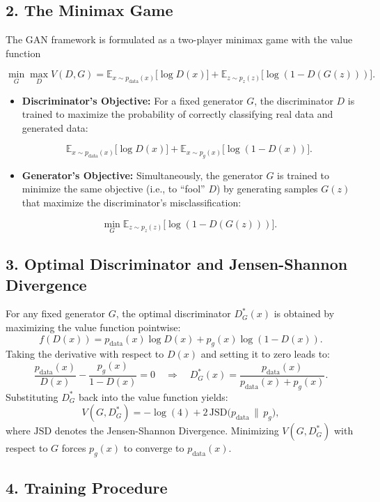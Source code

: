 \documentclass{article}
\begin{document}
\subsection*{2. The Minimax Game}

The GAN framework is formulated as a two-player minimax game with the value function

\[
\min_{G} \max_{D} V(D,G) = \mathbb{E}_{x\sim p_{\text{data}}(x)}\big[\log D(x)\big] + \mathbb{E}_{z\sim p_z(z)}\big[\log (1 - D(G(z)))\big].
\]

\begin{itemize}
    \item \textbf{Discriminator’s Objective:} For a fixed generator $G$, the discriminator $D$ is trained to maximize the probability of correctly classifying real data and generated data:

    \[
    \mathbb{E}_{x\sim p_{\text{data}}(x)}\big[\log D(x)\big] + \mathbb{E}_{x\sim p_g(x)}\big[\log (1 - D(x))\big].
    \]

    \item \textbf{Generator’s Objective:} Simultaneously, the generator $G$ is trained to minimize the same objective (i.e., to “fool” $D$) by generating samples $G(z)$ that maximize the discriminator's misclassification:

    \[
    \min_{G} \mathbb{E}_{z\sim p_z(z)}\big[\log (1 - D(G(z)))\big].
    \]
\end{itemize}

\subsection*{3. Optimal Discriminator and Jensen-Shannon Divergence}

For any fixed generator $G$, the optimal discriminator $D^*_G(x)$ is obtained by maximizing the value function pointwise:
\[
f(D(x)) = p_{\text{data}}(x) \log D(x) + p_g(x) \log (1 - D(x)).
\]
Taking the derivative with respect to $D(x)$ and setting it to zero leads to:
\[
\frac{p_{\text{data}}(x)}{D(x)} - \frac{p_g(x)}{1-D(x)} = 0 \quad \Longrightarrow \quad D^*_G(x) = \frac{p_{\text{data}}(x)}{p_{\text{data}}(x) + p_g(x)}.
\]
Substituting $D^*_G$ back into the value function yields:
\[
V(G, D^*_G) = -\log(4) + 2\, \mathrm{JSD}\big(p_{\text{data}} \,\|\, p_g\big),
\]
where $\mathrm{JSD}$ denotes the Jensen-Shannon Divergence. Minimizing $V(G, D^*_G)$ with respect to $G$ forces $p_g(x)$ to converge to $p_{\text{data}}(x)$.

\subsection*{4. Training Procedure}
\end{document}
